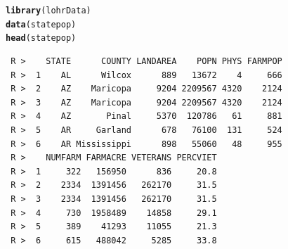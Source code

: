 \documentclass[10pt]{beamer}\usepackage[]{graphicx}\usepackage[]{xcolor}
\makeatletter
\newcommand{\hlnum}[1]{\textcolor[rgb]{0.686,0.059,0.569}{#1}}%
\newcommand{\hlopt}[1]{\textcolor[rgb]{0,0,0}{#1}}%
\newcommand{\hlstd}[1]{\textcolor[rgb]{0.345,0.345,0.345}{#1}}%
\newcommand{\hlkwb}[1]{\textcolor[rgb]{0.69,0.353,0.396}{#1}}%
\newcommand{\hlkwc}[1]{\textcolor[rgb]{0.333,0.667,0.333}{#1}}%
\newcommand{\hlkwd}[1]{\textcolor[rgb]{0.737,0.353,0.396}{\textbf{#1}}}%
\newenvironment{kframe}{%
 \def\at@end@of@kframe{}%
 \ifinner\ifhmode%
  \def\at@end@of@kframe{\end{minipage}}%
  \begin{minipage}{\columnwidth}%
 \fi\fi%
 \def\FrameCommand##1{\hskip\@totalleftmargin \hskip-\fboxsep
 \colorbox{shadecolor}{##1}\hskip-\fboxsep
     \hskip-\linewidth \hskip-\@totalleftmargin \hskip\columnwidth}%
 \MakeFramed {\advance\hsize-\width
   \@totalleftmargin\z@ \linewidth\hsize
   \@setminipage}}%
 {\par\unskip\endMakeFramed%
 \at@end@of@kframe}
\newenvironment{knitrout}{}{} %
\makeatother
\begin{document}
\begin{frame}[containsverbatim]{}

\tiny
\begin{knitrout}
\color{fgcolor}\begin{kframe}
\begin{alltt}
\hlkwd{library}\hlstd{(lohrData)}
\hlkwd{data}\hlstd{(statepop)}
\hlkwd{head}\hlstd{(statepop)}
\end{alltt}
\begin{verbatim}
 R >    STATE      COUNTY LANDAREA    POPN PHYS FARMPOP
 R >  1    AL      Wilcox      889   13672    4     666
 R >  2    AZ    Maricopa     9204 2209567 4320    2124
 R >  3    AZ    Maricopa     9204 2209567 4320    2124
 R >  4    AZ       Pinal     5370  120786   61     881
 R >  5    AR     Garland      678   76100  131     524
 R >  6    AR Mississippi      898   55060   48     955
 R >    NUMFARM FARMACRE VETERANS PERCVIET
 R >  1     322   156950      836     20.8
 R >  2    2334  1391456   262170     31.5
 R >  3    2334  1391456   262170     31.5
 R >  4     730  1958489    14858     29.1
 R >  5     389    41293    11055     21.3
 R >  6     615   488042     5285     33.8
\end{verbatim}
\end{kframe}
\end{knitrout}
\end{frame}


\end{document}
